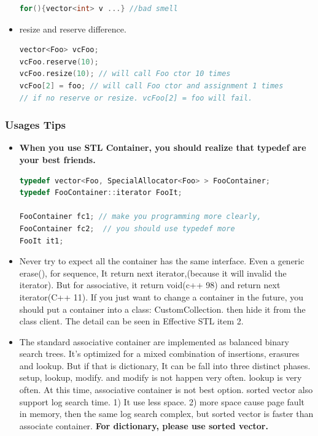 \documentclass[a4paper,12pt,twoside]{book}
\begin{document}
\begin{itemize}
\begin{lstlisting}[frame=single, language=c++]
for(){vector<int> v ...} //bad smell
\end{lstlisting}
\item resize and reserve difference.
\begin{lstlisting}[frame=single, language=c++]
vector<Foo> vcFoo;
vcFoo.reserve(10);
vcFoo.resize(10); // will call Foo ctor 10 times
vcFoo[2] = foo; // will call Foo ctor and assignment 1 times
// if no reserve or resize. vcFoo[2] = foo will fail.
\end{lstlisting}


\end{itemize}

\subsubsection{Usages Tips}
\begin{itemize}

\item \textbf{When you use STL Container, you should realize that typedef are your best friends.}
\begin{lstlisting}[frame=single, language=c++]
typedef vector<Foo, SpecialAllocator<Foo> > FooContainer;
typedef FooContainer::iterator FooIt;

FooContainer fc1; // make you programming more clearly,
FooContainer fc2;  // you should use typedef more
FooIt it1;
\end{lstlisting}


\item Never try to expect all the container has the same interface. Even a generic erase(), for sequence, It return next iterator,(because it will invalid the iterator).   But for associative, it return void(c++ 98) and return next iterator(C++ 11). If you just want to change a container in the future, you should put a container into a class: CustomCollection. then hide it from the class client. The detail can be seen in Effective STL item 2.

\item The standard associative container are implemented as balanced binary search trees.  It's optimized for a mixed combination of insertions, erasures and lookup.  But if that is dictionary, It can be fall into three distinct phases. setup, lookup, modify. and modify is not happen very often. lookup is very often. At this time, associative container is not best option. sorted vector also support log search time.  1) It use less space. 2) more space cause page fault in memory, then the same log search complex, but sorted vector is faster than associate container.\textbf{ For dictionary, please use sorted vector.}



\end{itemize}
\end{document}

